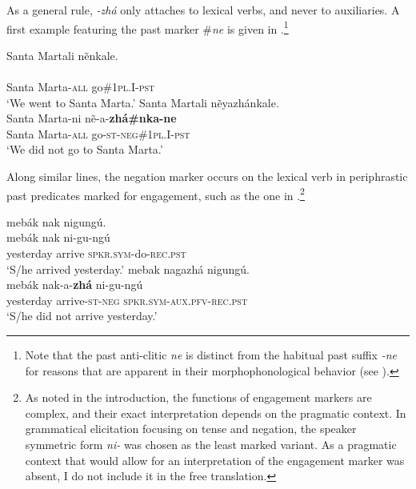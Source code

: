 \documentclass[output=paper,colorlinks,citecolor=brown]{langscibook}
\begin{document}
As a general rule, \textit{{}-zhá} only attaches to lexical verbs, and never to auxiliaries. A first example featuring the past marker \#\textit{ne} is given in .\footnote{Note that the past anti-clitic \textit{ne} is distinct from the habitual past suffix \textit{{}-ne} for reasons that are apparent in their morphophonological behavior (see ).}

\ea\label{ex:kog:5}
    \ea\label{ex:kog:5a}Santa Martali nẽnkale.\\
        \\ 
               Santa Marta-\textsc{all} go\textsc{\#1pl.I{}-pst}\\
        \glt ‘We went to Santa Marta.’
    \ex\label{ex:kog:5b} Santa Martali nẽyazhánkale.\\
        \gll  Santa Marta-ni nẽ{}-a-\textbf{zhá\#nka-ne}\\
              Santa Marta-\textsc{all} go{}-\textsc{st{}-neg\#1pl.I{}-pst}\\
        \glt  ‘We did not go to Santa Marta.’
    \z
\z 

Along similar lines, the negation marker occurs on the lexical verb in periphrastic past predicates marked for engagement, such as the one in .\footnote{As noted in the introduction, the functions of engagement markers are complex, and their exact interpretation depends on the pragmatic context. In grammatical elicitation focusing on tense and negation, the speaker symmetric form \textit{ni-} was chosen as the least marked variant. As a pragmatic context that would allow for an interpretation of the engagement marker was absent, I do not include it in the free translation.}
 
\ea\label{ex:kog:6}
    \ea\label{ex:kog:6a}  mebák nak nigungú.\\
        \gll  mebák nak ni-gu-ngú \\
        yesterday arrive \textsc{spkr.sym-}do{}-\textsc{rec.pst}\\
        \glt ‘S/he arrived yesterday.’
    \ex\label{ex:kog:6b} mebak nagazhá nigungú.\\
        \gll  mebák nak-a-\textbf{zhá} ni-gu-ngú\\
              yesterday arrive-\textsc{st-neg} \textsc{spkr.sym-aux.pfv}-\textsc{rec.pst}\\
        \glt ‘S/he did not arrive yesterday.’
    \z
\z 
\end{document}
